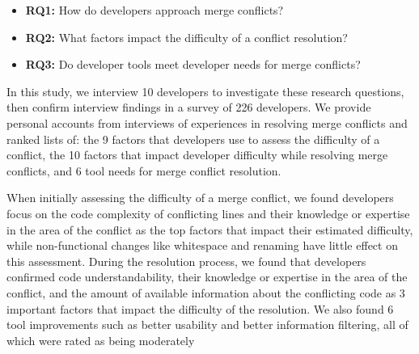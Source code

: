 \begin{itemize}
\item\textbf{RQ1:} How do developers approach merge conflicts?\\
\item\textbf{RQ2:} What factors impact the difficulty of a conflict resolution?\\
\item\textbf{RQ3:} Do developer tools meet developer needs for merge conflicts?\\
\end{itemize}

In this study, we interview 10 developers to investigate these research questions, then confirm interview findings in a survey of 226 developers. We provide personal accounts from interviews of experiences in resolving merge conflicts and ranked lists of: the 9 factors that developers use to assess the difficulty of a conflict, the 10 factors that impact developer difficulty while resolving merge conflicts, and 6 tool needs for merge conflict resolution.

When initially assessing the difficulty of a merge conflict, we found developers focus on the code complexity of conflicting lines and their knowledge or expertise in the area of the conflict as the top factors that impact their estimated difficulty, while non-functional changes like whitespace and renaming have little effect on this assessment. 
During the resolution process, we found that developers confirmed code understandability, their knowledge or expertise in the area of the conflict, and the amount of available information about the conflicting code as 3 important factors that impact the difficulty of the resolution.
We also found 6 tool improvements such as better usability and better information filtering, all of which were rated as being moderately 
